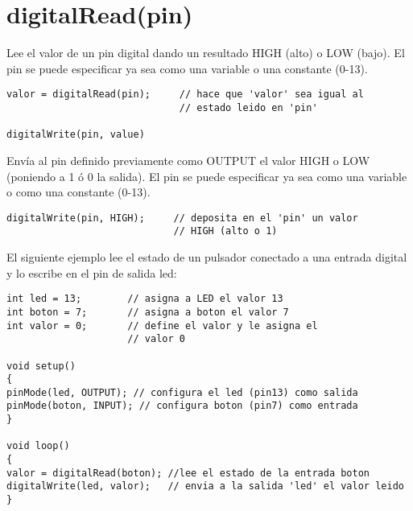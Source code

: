 \section{digitalRead(pin)}

Lee el valor de un pin digital dando un resultado HIGH (alto) o LOW (bajo). El pin se puede especificar ya sea como una variable o una constante (0-13).
\begin{lstlisting}
valor = digitalRead(pin);     // hace que 'valor' sea igual al
                              // estado leido en 'pin'

digitalWrite(pin, value)
\end{lstlisting}
Envía al pin definido previamente como OUTPUT el valor HIGH o LOW (poniendo a 1 ó 0 la salida). El pin se puede especificar ya sea como una variable o como una constante (0-13).
\begin{lstlisting}
digitalWrite(pin, HIGH);     // deposita en el 'pin' un valor
                             // HIGH (alto o 1)
\end{lstlisting}
El siguiente ejemplo lee el estado de un pulsador conectado a una entrada digital y lo escribe en el pin de salida led:
\begin{lstlisting}
int led = 13;        // asigna a LED el valor 13
int boton = 7;       // asigna a boton el valor 7
int valor = 0;       // define el valor y le asigna el
                     // valor 0

void setup()
{
pinMode(led, OUTPUT); // configura el led (pin13) como salida
pinMode(boton, INPUT); // configura boton (pin7) como entrada
}

void loop()
{
valor = digitalRead(boton); //lee el estado de la entrada boton
digitalWrite(led, valor);   // envia a la salida 'led' el valor leido
}
\end{lstlisting}